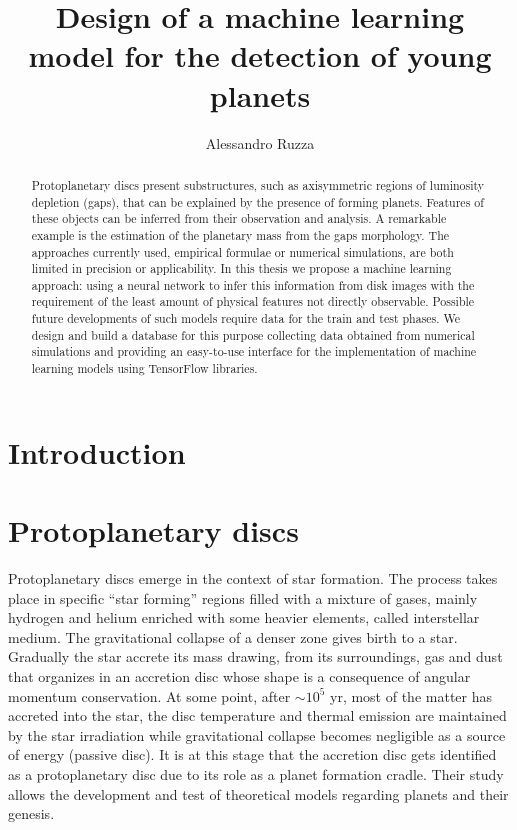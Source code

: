 \documentclass[a4paper,10pt]{report}
\title{Design of a machine learning model for the detection of young planets}
\author{Alessandro Ruzza}
\begin{document}
\maketitle

\begin{abstract}
    Protoplanetary discs present substructures,
    such as axisymmetric regions of luminosity depletion (gaps),
    that can be explained by the presence of forming planets. 
    Features of these objects can be inferred from their
    observation and analysis. A remarkable example is the 
    estimation of the planetary mass from the gaps morphology.
    The approaches currently used, empirical formulae or numerical
    simulations, are both limited in precision or applicability.
    In this thesis we propose a machine learning approach:
    using a neural network to infer this information from 
    disk images with the requirement of the least amount
    of physical features not directly observable.
    Possible future developments of such models require 
    data for the train and test phases.
    We design and build a database for this purpose collecting 
    data obtained from numerical simulations and providing an 
    easy-to-use interface for the implementation of machine learning
    models using TensorFlow libraries.
\end{abstract}

\tableofcontents

\chapter{Introduction}


\chapter{Protoplanetary discs}

Protoplanetary discs emerge in the context of star formation. 
The process takes place in specific ``star forming'' regions filled with a mixture of gases, mainly hydrogen and helium enriched with some
heavier elements, called interstellar medium. The gravitational collapse of a denser zone gives birth to a star. Gradually the star
accrete its mass drawing, from its surroundings, gas and dust that organizes in an accretion disc whose shape is a consequence of angular momentum conservation.
At some point, after $\sim 10^5$ yr, most of the matter has accreted into the star,
the disc temperature and thermal emission are maintained by the star irradiation while gravitational collapse becomes negligible as a source of energy (passive disc). 
It is at this stage that the accretion disc gets identified
as a protoplanetary disc due to its role as a planet formation cradle.
Their study allows the development and test of theoretical models regarding planets and their genesis.
\end{document}
